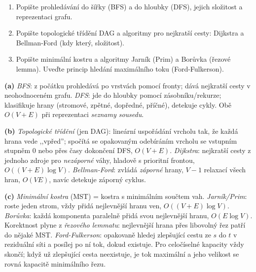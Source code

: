 \begin{zadani}
\begin{enumerate}[label=(\alph*)]
  \item {} Popište prohledávání do šířky (BFS) a do hloubky (DFS), jejich složitost a reprezentaci grafu.
  \item {} Popište topologické třídění DAG a algoritmy pro nejkratší cesty: Dijkstra a Bellman-Ford (kdy který, složitost).
  \item {} Popište minimální kostru a algoritmy Jarník (Prim) a Borůvka (řezové lemma). Uveďte princip hledání maximálního toku (Ford-Fulkerson).
\end{enumerate}
\end{zadani}

\begin{reseni}
\textbf{(a)} \emph{BFS}: z počátku prohledává po vrstvách pomocí fronty; dává nejkratší cesty v neohodnoceném grafu. \emph{DFS}: jde do hloubky pomocí zásobníku/rekurze; klasifikuje hrany (stromové, zpětné, dopředné, příčné), detekuje cykly. Obě $O(V+E)$ při reprezentaci \emph{seznamy sousedu}.

\textbf{(b)} \emph{Topologické třídění} (jen DAG): lineární uspořádání vrcholu tak, že každá hrana vede ,,vpřed''; spočítá se opakovaným odebíráním vrcholu se vstupním stupněm 0 nebo přes časy dokončení DFS, $O(V+E)$. \emph{Dijkstra}: nejkratší cesty z jednoho zdroje pro \emph{nezáporné} váhy, hladově s prioritní frontou, $O((V+E)\log V)$. \emph{Bellman-Ford}: zvládá \emph{záporné} hrany, $V-1$ relaxací všech hran, $O(VE)$, navíc detekuje záporný cyklus.

\textbf{(c)} \emph{Minimální kostra} (MST) = kostra s minimálním součtem vah. \emph{Jarník/Prim}: roste jeden strom, vždy přidá nejlevnější hranu ven, $O((V+E)\log V)$. \emph{Borůvka}: každá komponenta paralelně přidá svou nejlevnější hranu, $O(E\log V)$. Korektnost plyne z \emph{řezového lemmatu}: nejlevnější hrana přes libovolný řez patří do nějaké MST. \emph{Ford-Fulkerson}: opakovaně hledej zlepšující cestu ze $s$ do $t$ v reziduální síti a posílej po ní tok, dokud existuje. Pro celočíselné kapacity vždy skončí; když už zlepšující cesta neexistuje, je tok maximální a jeho velikost se rovná kapacitě minimálního řezu.
\end{reseni}

